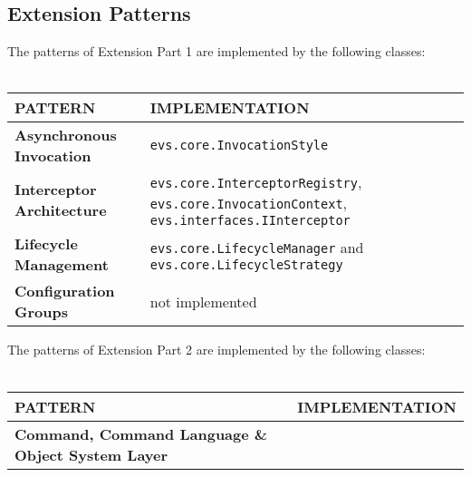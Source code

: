 \documentclass[a4paper]{article}
\begin{document}
\vspace{1cm}

\subsection*{Extension Patterns}

The patterns of Extension Part 1 are implemented by the following classes:\\\\

\begin{tabular}{| l | l |}\hline
\textbf{PATTERN} & \textbf{IMPLEMENTATION}\\\hline\hline
\textbf{Asynchronous Invocation} & \texttt{evs.core.InvocationStyle} \\\hline
\textbf{Interceptor Architecture} & \texttt{evs.core.InterceptorRegistry}, \texttt{evs.core.InvocationContext}, \texttt{evs.interfaces.IInterceptor}\\\hline
\textbf{Lifecycle Management} & \texttt{evs.core.LifecycleManager} and \texttt{evs.core.LifecycleStrategy}\\\hline
\textbf{Configuration Groups} & not implemented \\\hline
\end{tabular}

The patterns of Extension Part 2 are implemented by the following classes:\\\\

\begin{tabular}{| l | l |}\hline
\textbf{PATTERN} & \textbf{IMPLEMENTATION}\\\hline\hline
\textbf{Command, Command Language \& Object System Layer} & \\\hline
\end{tabular}
\end{document}
